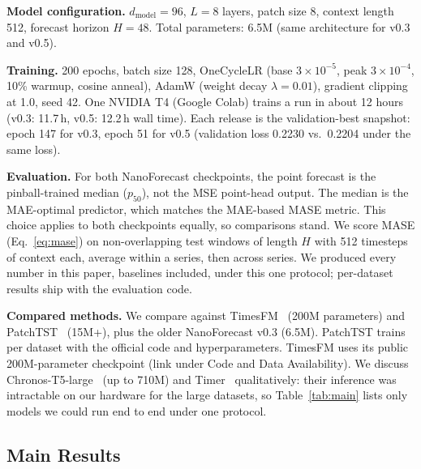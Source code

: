 \documentclass[11pt]{article}
\begin{document}
\textbf{Model configuration.} $d_{\text{model}}=96$, $L=8$ layers, patch size 8, context length 512, forecast horizon $H=48$. Total parameters: 6.5M (same architecture for v0.3 and v0.5).

\textbf{Training.} 200 epochs, batch size 128, OneCycleLR (base $3 \times 10^{-5}$, peak $3 \times 10^{-4}$, 10\% warmup, cosine anneal), AdamW (weight decay $\lambda=0.01$), gradient clipping at 1.0, seed 42. One NVIDIA T4 (Google Colab) trains a run in about 12 hours (v0.3: 11.7\,h, v0.5: 12.2\,h wall time). Each release is the validation-best snapshot: epoch 147 for v0.3, epoch 51 for v0.5 (validation loss 0.2230 vs.\ 0.2204 under the same loss).

\textbf{Evaluation.} For both NanoForecast checkpoints, the point forecast is the pinball-trained median ($p_{50}$), not the MSE point-head output. The median is the MAE-optimal predictor, which matches the MAE-based MASE metric. This choice applies to both checkpoints equally, so comparisons stand. We score MASE (Eq.~\ref{eq:mase}) on non-overlapping test windows of length $H$ with 512 timesteps of context each, average within a series, then across series. We produced every number in this paper, baselines included, under this one protocol; per-dataset results ship with the evaluation code.

\textbf{Compared methods.} We compare against TimesFM~\cite{timesfm} (200M parameters) and PatchTST~\cite{patchtst} (15M+), plus the older NanoForecast v0.3 (6.5M). PatchTST trains per dataset with the official code and hyperparameters. TimesFM uses its public 200M-parameter checkpoint (link under Code and Data Availability). We discuss Chronos-T5-large~\cite{chronos} (up to 710M) and Timer~\cite{timer} qualitatively: their inference was intractable on our hardware for the large datasets, so Table~\ref{tab:main} lists only models we could run end to end under one protocol.

\subsection{Main Results}
\label{sec:results}
\end{document}
